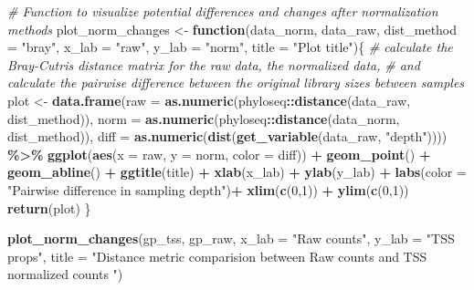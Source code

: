 \documentclass[
]{book}
\newenvironment{Shaded}{\begin{snugshade}}{\end{snugshade}}
\newcommand{\CommentTok}[1]{\textcolor[rgb]{0.56,0.35,0.01}{\textit{#1}}}
\newcommand{\ControlFlowTok}[1]{\textcolor[rgb]{0.13,0.29,0.53}{\textbf{#1}}}
\newcommand{\DataTypeTok}[1]{\textcolor[rgb]{0.13,0.29,0.53}{#1}}
\newcommand{\DecValTok}[1]{\textcolor[rgb]{0.00,0.00,0.81}{#1}}
\newcommand{\KeywordTok}[1]{\textcolor[rgb]{0.13,0.29,0.53}{\textbf{#1}}}
\newcommand{\NormalTok}[1]{#1}
\newcommand{\OperatorTok}[1]{\textcolor[rgb]{0.81,0.36,0.00}{\textbf{#1}}}
\newcommand{\StringTok}[1]{\textcolor[rgb]{0.31,0.60,0.02}{#1}}
\begin{document}
\begin{Shaded}
\begin{Highlighting}[]
\CommentTok{\# Function to visualize potential differences and changes after normalization methods}
\NormalTok{plot\_norm\_changes \textless{}{-}}\StringTok{ }\ControlFlowTok{function}\NormalTok{(data\_norm, data\_raw, }\DataTypeTok{dist\_method =} \StringTok{"bray"}\NormalTok{, }\DataTypeTok{x\_lab =} \StringTok{"raw"}\NormalTok{, }\DataTypeTok{y\_lab =} \StringTok{"norm"}\NormalTok{, }\DataTypeTok{title =} \StringTok{"Plot title"}\NormalTok{)\{}
    \CommentTok{\# calculate the Bray{-}Cutris distance matrix for the raw data, the normalized data, }
    \CommentTok{\# and calculate the pairwise difference between the original library sizes between samples}
\NormalTok{    plot \textless{}{-}}\StringTok{ }\KeywordTok{data.frame}\NormalTok{(}\DataTypeTok{raw =} \KeywordTok{as.numeric}\NormalTok{(phyloseq}\OperatorTok{::}\KeywordTok{distance}\NormalTok{(data\_raw, dist\_method)), }
                       \DataTypeTok{norm =} \KeywordTok{as.numeric}\NormalTok{(phyloseq}\OperatorTok{::}\KeywordTok{distance}\NormalTok{(data\_norm, dist\_method)), }
                       \DataTypeTok{diff =} \KeywordTok{as.numeric}\NormalTok{(}\KeywordTok{dist}\NormalTok{(}\KeywordTok{get\_variable}\NormalTok{(data\_raw, }\StringTok{"depth"}\NormalTok{)))) }\OperatorTok{\%\textgreater{}\%}\StringTok{ }
\StringTok{    }\KeywordTok{ggplot}\NormalTok{(}\KeywordTok{aes}\NormalTok{(}\DataTypeTok{x =}\NormalTok{ raw, }\DataTypeTok{y =}\NormalTok{ norm, }\DataTypeTok{color =}\NormalTok{ diff)) }\OperatorTok{+}\StringTok{ }
\StringTok{        }\KeywordTok{geom\_point}\NormalTok{() }\OperatorTok{+}\StringTok{ }
\StringTok{        }\KeywordTok{geom\_abline}\NormalTok{() }\OperatorTok{+}\StringTok{ }
\StringTok{        }\KeywordTok{ggtitle}\NormalTok{(title) }\OperatorTok{+}
\StringTok{        }\KeywordTok{xlab}\NormalTok{(x\_lab) }\OperatorTok{+}\StringTok{ }\KeywordTok{ylab}\NormalTok{(y\_lab) }\OperatorTok{+}
\StringTok{        }\KeywordTok{labs}\NormalTok{(}\DataTypeTok{color =} \StringTok{"Pairwise difference in sampling depth"}\NormalTok{)}\OperatorTok{+}
\StringTok{      }\KeywordTok{xlim}\NormalTok{(}\KeywordTok{c}\NormalTok{(}\DecValTok{0}\NormalTok{,}\DecValTok{1}\NormalTok{)) }\OperatorTok{+}\StringTok{ }\KeywordTok{ylim}\NormalTok{(}\KeywordTok{c}\NormalTok{(}\DecValTok{0}\NormalTok{,}\DecValTok{1}\NormalTok{))}
    \KeywordTok{return}\NormalTok{(plot)}
\NormalTok{\}}

\KeywordTok{plot\_norm\_changes}\NormalTok{(gp\_tss, gp\_raw,}
                  \DataTypeTok{x\_lab =} \StringTok{"Raw counts"}\NormalTok{, }\DataTypeTok{y\_lab =} \StringTok{"TSS props"}\NormalTok{, }
                  \DataTypeTok{title =} \StringTok{"Distance metric comparision between Raw counts and TSS normalized counts "}\NormalTok{)}
\end{Highlighting}
\end{Shaded}
\end{document}
